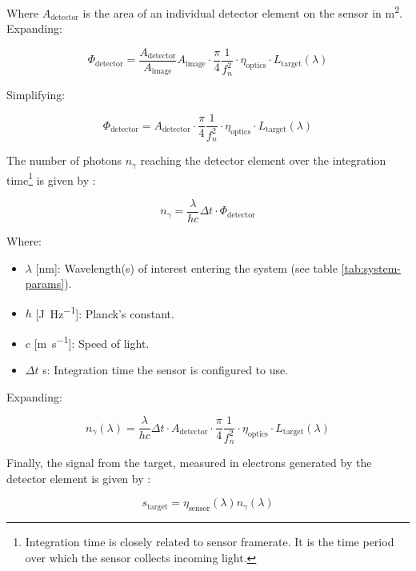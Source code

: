 \documentclass{article}
\begin{document}
Where $A_{\text{detector}}$ is the area of an individual detector element on the sensor in \si{\meter\squared}. Expanding:

\begin{equation}
    \Phi_{\text{detector}} = \frac{A_{\text{detector}}}{A_{\text{image}}} A_{\text{image}} \cdot \frac{\pi}{4}\frac{1}{f_n^2} \cdot \eta_{\text{optics}} \cdot L_{\text{target}}(\lambda)
\end{equation}

Simplifying:

\begin{equation}
    \Phi_{\text{detector}} = A_{\text{detector}} \cdot \frac{\pi}{4}\frac{1}{f_n^2} \cdot \eta_{\text{optics}} \cdot L_{\text{target}}(\lambda)
\end{equation}

The number of photons $n_\gamma$ reaching the detector element over the integration time\footnote{Integration time is closely related to sensor framerate. It is the time period over which the sensor collects incoming light.} is given by \cite{Fiete2001-kz}:

\begin{equation}
    n_\gamma = \frac{\lambda}{hc} \Delta t \cdot \Phi_{\text{detector}}
\end{equation}

Where:
\begin{itemize}[label={}]
    \item $\lambda$ [\si{\nm}]: Wavelength(s) of interest entering the system (see table \ref{tab:system-params}).
    \item $h$ [\si{\joule\per\hertz}]: Planck's constant.
    \item $c$ [\si{\meter\per\second}]: Speed of light.
    \item $\Delta t$ \si{\second}: Integration time the sensor is configured to use.
\end{itemize}

Expanding:

\begin{equation}
    n_\gamma(\lambda) = \frac{\lambda}{hc} \Delta t \cdot A_{\text{detector}} \cdot \frac{\pi}{4}\frac{1}{f_n^2} \cdot \eta_{\text{optics}} \cdot L_{\text{target}}(\lambda)
\end{equation}


Finally, the signal from the target, measured in electrons generated by the detector element is given by \cite{Fiete2001-kz}:

\begin{equation} 
    s_{\text{target}} = \eta_{\text{sensor}}(\lambda) n_\gamma(\lambda) %
\end{equation}
\end{document}
